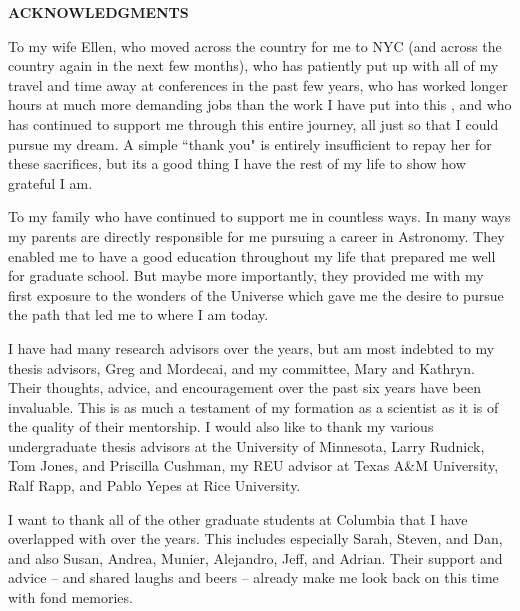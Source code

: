 %
%
%
%

\newpage

\begin{center}

{\large \bf ACKNOWLEDGMENTS } %

\end{center}

\vspace{0.8cm}

To my wife Ellen, who moved across the country for me to NYC
(and across the country again in the next few months), who has patiently put up with
all of my travel and time away at conferences in the past few years,
who has worked longer hours at much more demanding jobs than the work I have put
into this \dissertation, and who has continued to support me through this
entire journey, all just so that I could pursue my dream. A simple ``thank you" is
entirely insufficient to repay her for these sacrifices, but its a good thing
I have the rest of my life to show how grateful I am.

To my family who have continued to support me in countless ways.
In many ways my parents are directly responsible for me pursuing a career in Astronomy.
They enabled me to have a good education throughout my life that prepared me
well for graduate school. But maybe more importantly, they provided me with my
first exposure to the wonders of the Universe which gave me the desire to
pursue the path that led me to where I am today.

I have had many research advisors over the years, but am most indebted to
my thesis advisors, Greg and Mordecai, and my committee, Mary and Kathryn. Their
thoughts, advice, and encouragement over the past six years have been invaluable.
This \dissertation  is as much a testament of my formation as a scientist as it
is of the quality of their mentorship. I would also like to thank my various
undergraduate thesis advisors at the University of Minnesota,
Larry Rudnick, Tom Jones, and Priscilla Cushman, my REU advisor at
Texas A\&M University, Ralf Rapp, and Pablo Yepes at Rice University.

I want to thank all of the other graduate students at Columbia that I have overlapped
with over the years. This includes especially Sarah, Steven, and Dan,
and also Susan, Andrea, Munier, Alejandro, Jeff, and Adrian.
Their support and advice -- and shared laughs and beers --
already make me look back on this time with fond memories.

